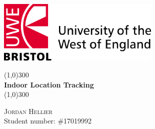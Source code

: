 \begin{titlepage}

		\includegraphics[height=3cm]{./images/uwe_logo.jpg}
		\vspace{25mm}

	\begin{center}
		\line(1,0){300}\\
		[5mm]
		\huge{\bfseries Indoor Location Tracking}\\
		[2mm]
		\line(1,0){300}\\
		[10cm]
	\end{center}
	\begin{flushright}
	\textsc{\Large Jordan Hellier}\\
	Student number: \#17019992
	\end{flushright}
\end{titlepage}